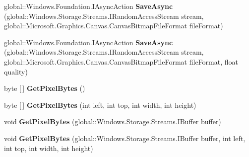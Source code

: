 \begin{DoxyCompactItemize}
\item 
\mbox{\label{interface_microsoft_1_1_graphics_1_1_canvas_1_1_i_canvas_bitmap_a5dcf0ab30780f638bbfddc389d7b02db}} 
global\+::\+Windows.\+Foundation.\+I\+Async\+Action {\bfseries Save\+Async} (global\+::\+Windows.\+Storage.\+Streams.\+I\+Random\+Access\+Stream stream, global\+::\+Microsoft.\+Graphics.\+Canvas.\+Canvas\+Bitmap\+File\+Format file\+Format)
\item 
\mbox{\label{interface_microsoft_1_1_graphics_1_1_canvas_1_1_i_canvas_bitmap_afdef00bc9d9842506f809195ede3782f}} 
global\+::\+Windows.\+Foundation.\+I\+Async\+Action {\bfseries Save\+Async} (global\+::\+Windows.\+Storage.\+Streams.\+I\+Random\+Access\+Stream stream, global\+::\+Microsoft.\+Graphics.\+Canvas.\+Canvas\+Bitmap\+File\+Format file\+Format, float quality)
\item 
\mbox{\label{interface_microsoft_1_1_graphics_1_1_canvas_1_1_i_canvas_bitmap_ab71519e7f2009a2ac025f505eab45531}} 
byte \mbox{[}$\,$\mbox{]} {\bfseries Get\+Pixel\+Bytes} ()
\item 
\mbox{\label{interface_microsoft_1_1_graphics_1_1_canvas_1_1_i_canvas_bitmap_a41fdae7de41d057403b9f1a16ecff1d2}} 
byte \mbox{[}$\,$\mbox{]} {\bfseries Get\+Pixel\+Bytes} (int left, int top, int width, int height)
\item 
\mbox{\label{interface_microsoft_1_1_graphics_1_1_canvas_1_1_i_canvas_bitmap_a36158bf3dac9d5cdb9a1a41a7fc3708d}} 
void {\bfseries Get\+Pixel\+Bytes} (global\+::\+Windows.\+Storage.\+Streams.\+I\+Buffer buffer)
\item 
\mbox{\label{interface_microsoft_1_1_graphics_1_1_canvas_1_1_i_canvas_bitmap_a6854e3ad20296f41992100acc94e6bdb}} 
void {\bfseries Get\+Pixel\+Bytes} (global\+::\+Windows.\+Storage.\+Streams.\+I\+Buffer buffer, int left, int top, int width, int height)
\item 
\mbox{\label{interface_microsoft_1_1_graphics_1_1_canvas_1_1_i_canvas_bitmap_ad6aeb3bf7ad3092e46d6a3133472b1d1}} 

\end{DoxyCompactItemize}
